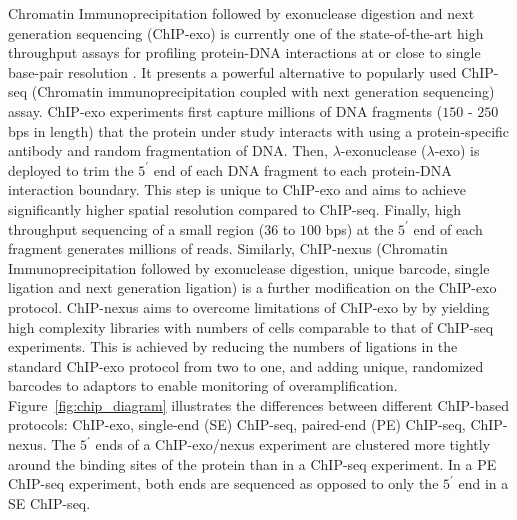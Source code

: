 Chromatin Immunoprecipitation followed by exonuclease digestion and
next generation sequencing (ChIP-exo) is currently one of the
state-of-the-art high throughput assays for profiling protein-DNA
interactions at or close to single base-pair resolution
\cite{exo1}. It presents a powerful alternative to popularly used
ChIP-seq (Chromatin immunoprecipitation coupled with next generation
sequencing) assay. ChIP-exo experiments first capture millions of DNA
fragments ($150$ - $250$ bps in length) that the protein under study
interacts with using a protein-specific antibody and random
fragmentation of DNA. Then, $\lambda$-exonuclease ($\lambda$-exo) is
deployed to trim the $5^{\prime}$ end of each DNA fragment to each
protein-DNA interaction boundary. This step is unique to ChIP-exo and
aims to achieve significantly higher spatial resolution compared to
ChIP-seq. Finally, high throughput sequencing of a small region ($36$
to $100$ bps) at the $5^{\prime}$ end of each fragment generates
millions of reads.  Similarly, ChIP-nexus (Chromatin
Immunoprecipitation followed by exonuclease digestion, unique barcode,
single ligation and next generation ligation) \cite{chipnexus} is a
further modification on the ChIP-exo protocol. ChIP-nexus aims to
overcome limitations of ChIP-exo by by yielding high complexity
libraries with numbers of cells comparable to that of ChIP-seq
experiments. This is achieved by reducing the numbers of ligations in
the standard ChIP-exo protocol from two to one, and adding unique,
randomized barcodes to adaptors to enable monitoring of
overamplification.
Figure~\ref{fig:chip_diagram} illustrates the differences between
different ChIP-based protocols: ChIP-exo, single-end (SE) ChIP-seq,
paired-end (PE) ChIP-seq, ChIP-nexus. The $5^{\prime}$ ends of a
ChIP-exo/nexus experiment are clustered more tightly around the
binding sites of the protein than in a ChIP-seq experiment. In a PE
ChIP-seq experiment, both ends are sequenced as opposed to only the
$5^{\prime}$ end in a SE ChIP-seq. 

